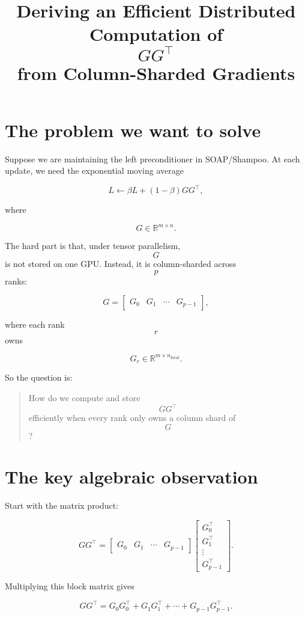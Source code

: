 \documentclass[11pt]{article}
\title{Deriving an Efficient Distributed Computation of $$GG^\top$$ from Column-Sharded Gradients}
\author{}
\date{}
\begin{document}
\maketitle

\section{The problem we want to solve}

Suppose we are maintaining the left preconditioner in SOAP/Shampoo. At each update, we need the exponential moving average

$$
L \leftarrow \beta L + (1-\beta)GG^\top,
$$

where

$$
G \in \mathbb{R}^{m \times n}.
$$

The hard part is that, under tensor parallelism, $$G$$ is not stored on one GPU. Instead, it is column-sharded across $$p$$ ranks:

$$
G =
\begin{bmatrix}
G_0 & G_1 & \cdots & G_{p-1}
\end{bmatrix},
$$

where each rank $$r$$ owns

$$
G_r \in \mathbb{R}^{m \times n_{\text{local}}}.
$$

So the question is:

\begin{quote}
How do we compute and store $$GG^\top$$ efficiently when every rank only owns a column shard of $$G$$?
\end{quote}

\section{The key algebraic observation}

Start with the matrix product:

$$
GG^\top
=
\begin{bmatrix}
G_0 & G_1 & \cdots & G_{p-1}
\end{bmatrix}
\begin{bmatrix}
G_0^\top \\
G_1^\top \\
\vdots \\
G_{p-1}^\top
\end{bmatrix}.
$$

Multiplying this block matrix gives

$$
GG^\top
=
G_0G_0^\top
+
G_1G_1^\top
+
\cdots
+
G_{p-1}G_{p-1}^\top.
$$
\end{document}
